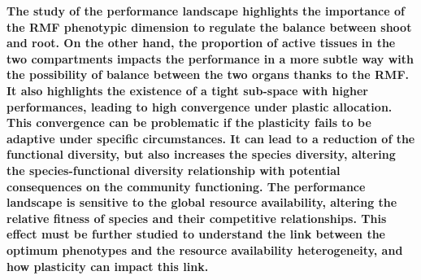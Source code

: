 %
%
%

\textbf{The study of the performance landscape highlights the importance of the RMF phenotypic dimension to regulate the balance between shoot and root. On the other hand, the proportion of active tissues in the two compartments impacts the performance in a more subtle way with the possibility of balance between the two organs thanks to the RMF. It also highlights the existence of a tight sub-space with higher performances, leading to high convergence under plastic allocation. This convergence can be problematic if the plasticity fails to be adaptive under specific circumstances. It can lead to a reduction of the functional diversity, but also increases the species diversity, altering the species-functional diversity relationship with potential consequences on the community functioning. The performance landscape is sensitive to the global resource availability, altering the relative fitness of species and their competitive relationships. This effect must be further studied to understand the link between the optimum phenotypes and the resource availability heterogeneity, and how plasticity can impact this link. }



